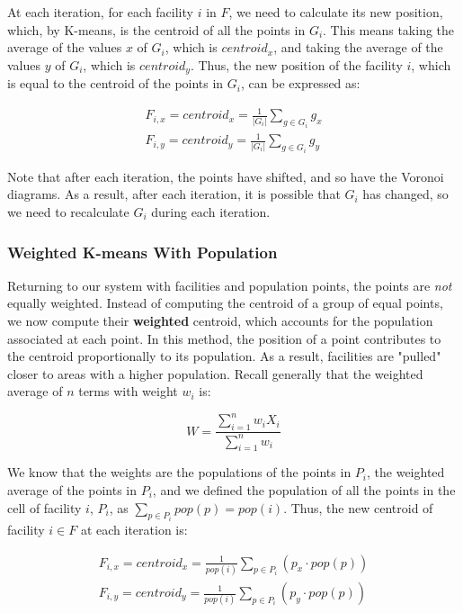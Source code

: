 \documentclass{article}
\begin{document}
At each iteration, for each facility $i$ in $F$, we need to calculate its new position, which, by K-means, is the centroid of all the points in $G_i$. This means taking the average of the values $x$ of $G_i$, which is $centroid_x$, and taking the average of the values $y$ of $G_i$, which is $centroid_y$. Thus, the new position of the facility $i$, which is equal to the centroid of the points in $G_i$, can be expressed as:

\begin{gather}
    F_{i, x} = centroid_x = \frac{1}{|G_i|} \sum_{g \in G_i}{g_x}\\
    F_{i, y} = centroid_y = \frac{1}{|G_i|} \sum_{g \in G_i}{g_y}
\end{gather}

Note that after each iteration, the points have shifted, and so have the Voronoi diagrams. As a result, after each iteration, it is possible that $G_i$ has changed, so we need to recalculate $G_i$ during each iteration.

\subsubsection*{Weighted K-means With Population}

Returning to our system with facilities and population points, the points are \textit{not} equally weighted. Instead of computing the centroid of a group of equal points, we now compute their \textbf{weighted} centroid, which accounts for the population associated at each point. In this method, the position of a point contributes to the centroid proportionally to its population. As a result, facilities are "pulled" closer to areas with a higher population. Recall generally that the weighted average of $n$ terms with weight $w_i$ is:

$$
W = \frac{\sum_{i=1}^{n}{w_iX_i}}{\sum_{i=1}^{n}w_i}
$$

We know that the weights are the populations of the points in $P_i$, the weighted average of the points in $P_i$, and we defined the population of all the points in the cell of facility $i$, $P_i$, as  $\sum_{p \in P_i} pop(p) = pop(i)$. Thus, the new centroid of facility $i \in F$ at each iteration is:

\begin{gather}
    F_{i, x} = centroid_x = \frac{1}{pop(i)} \sum_{p\in P_i} \left( p_x \cdot pop(p) \right) \\
    F_{i,y} = centroid_y = \frac{1}{pop(i)} \sum_{p \in P_i} \left( p_y \cdot pop(p) \right)
\end{gather}
\end{document}
